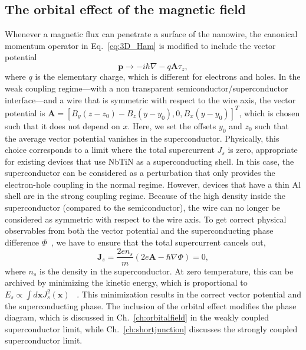 \subsection{The orbital effect of the magnetic field}\label{sec:orbital_effect_of_magnetic_field}
Whenever a magnetic flux can penetrate a surface of the nanowire, the canonical momentum operator in Eq.~\eqref{eq:3D_Ham} is modified to include the vector potential
\begin{equation}
\bm{p} \rightarrow -i \hbar \nabla - q \bm{A} \tau_z,\label{eq:continuum_kinetic_with_orbital}
\end{equation}
where $q$ is the elementary charge, which is different for electrons and holes.
In the weak coupling regime---with a non transparent semiconductor/superconductor interface---and a wire that is symmetric with respect to the wire axis, the vector potential is $\mathbf{A}={\left[ B_y (z - z_0) - B_z (y - y_0), 0, B_x (y - y_0)\right]}^{T}$, which is chosen such that it does not depend on $x$.
Here, we set the offsets $y_0$ and $z_0$ such that the average vector potential vanishes in the superconductor.
Physically, this choice corresponds to a limit where the total supercurrent $J_s$ is zero, appropriate for existing devices that use NbTiN as a superconducting shell.
In this case, the superconductor can be considered as a perturbation that only provides the electron-hole coupling in the normal regime.
However, devices that have a thin Al shell are in the strong coupling regime.
Because of the high density inside the superconductor (compared to the semiconductor), the wire can no longer be considered as symmetric with respect to the wire axis.
To get correct physical observables from both the vector potential and the superconducting phase difference $\Phi$~\cite{Wojcik2018}, we have to ensure that the total supercurrent cancels out,
\begin{equation}
\bm{J}_s = \frac{2e n_s}{m}\left(2e \bm{A} - \hbar \nabla \Phi \right)=0,
\end{equation}
where $n_s$ is the density in the superconductor.
At zero temperature, this can be archived by minimizing the kinetic energy, which is proportional to $E_s \propto \int d \bm{x} J_s^2(\bm{x})$ ~\cite{Winkler2019}.
This minimization results in the correct vector potential and the superconducting phase.
The inclusion of the orbital effect modifies the phase diagram, which is discussed in Ch.~\ref{ch:orbitalfield} in the weakly coupled superconductor limit, while Ch.~\ref{ch:shortjunction} discusses the strongly coupled superconductor limit.


